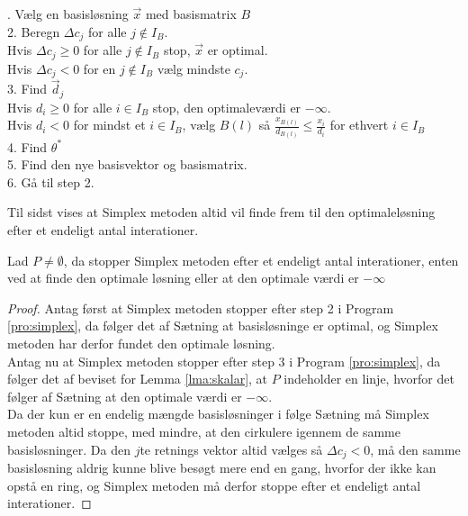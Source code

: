 \begin{pro}
. Vælg en basisløsning $\vec{x}$ med basismatrix $B$
\\ 2. Beregn $\Delta c_j$ for alle $j \notin I_B$. 
\\  		\qquad Hvis $\Delta c_j\geq 0$ for alle $j \notin I_B$ stop, $\vec{x}$ er optimal.
\\		\qquad  Hvis $\Delta c_j < 0$ for en $j \notin I_B$ vælg mindste $c_j$.
\\ 3. Find $\vec{d}_j$
\\		\qquad  Hvis $d_i \geq 0 $ for alle $i \in I_B$ stop, den optimaleværdi er $- \infty$.
\\		\qquad  Hvis $d_i < 0 $ for mindst et $i \in I_B$, vælg $B(l)$ så $\frac{x_{B(l)}}{d_{B(l)}}\leq \frac{x_i}{d_i} $ for ethvert $i \in I_B$
\\ 4. Find $\theta^*$
\\ 5. Find den nye basisvektor og basismatrix.
\\ 6. Gå til step 2.
\label{pro:simplex}
\end{pro}
Til sidst vises at Simplex metoden altid vil finde frem til den optimaleløsning efter et endeligt antal interationer.
\begin{stn}
Lad $P \neq \emptyset$, da stopper Simplex metoden efter et endeligt antal interationer, enten ved at finde den optimale løsning eller at den optimale værdi er $- \infty$
\end{stn}
\begin{proof}
Antag først at Simplex metoden stopper efter step 2 i Program \ref{pro:simplex}, da følger det af Sætning 
at basisløsninge er optimal, og Simplex metoden har derfor fundet den optimale løsning.
\\ Antag nu at Simplex metoden stopper efter step 3 i Program \ref{pro:simplex}, da følger det af beviset for Lemma \ref{lma:skalar}, at $P$ indeholder en linje, hvorfor det følger af Sætning
at den optimale værdi er $-\infty$.
\\ Da der kun er en endelig mængde basisløsninger i følge Sætning 
må Simplex metoden altid stoppe, med mindre, at den cirkulere igennem de samme basisløsninger.
Da den $j$te retnings vektor altid vælges så $\Delta c_j < 0$, må den samme basisløsning aldrig kunne blive besøgt mere end en gang, hvorfor der ikke kan opstå en ring, og Simplex metoden må derfor stoppe efter et endeligt antal interationer.
\end{proof} 




